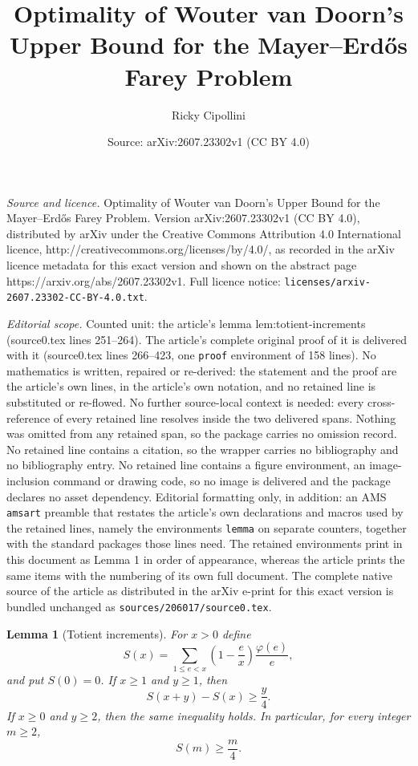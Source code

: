 \documentclass[10pt,a4paper]{amsart}
\title{Optimality of Wouter van Doorn's Upper Bound for the Mayer--Erdős Farey Problem}
\author{Ricky Cipollini}
\date{Source: arXiv:2607.23302v1 (CC BY 4.0)}
\newtheorem{lemma}{Lemma}
\begin{document}
\maketitle

\noindent\emph{Source and licence.} Optimality of Wouter van Doorn's Upper Bound for the Mayer--Erdős Farey Problem. Version arXiv:2607.23302v1 (CC BY 4.0), distributed by arXiv under the Creative Commons Attribution 4.0 International licence, http://creativecommons.org/licenses/by/4.0/, as recorded in the arXiv licence metadata for this exact version and shown on the abstract page https://arxiv.org/abs/2607.23302v1. Full licence notice: \texttt{licenses/arxiv-2607.23302-CC-BY-4.0.txt}.\par\smallskip

\noindent\textit{Editorial scope.} Counted unit: the article's lemma lem:totient-increments (source0.tex lines 251--264). The article's complete original proof of it is delivered with it (source0.tex lines 266--423, one \texttt{proof} environment of 158 lines). No mathematics is written, repaired or re-derived: the statement and the proof are the article's own lines, in the article's own notation, and no retained line is substituted or re-flowed.  No further source-local context is needed: every cross-reference of every retained line resolves inside the two delivered spans.  Nothing was omitted from any retained span, so the package carries no omission record.  No retained line contains a citation, so the wrapper carries no bibliography and no bibliography entry.  No retained line contains a figure environment, an image-inclusion command or drawing code, so no image is delivered and the package declares no asset dependency.  Editorial formatting only, in addition: an AMS \texttt{amsart} preamble that restates the article's own declarations and macros used by the retained lines, namely the environments \texttt{lemma} on separate counters, together with the standard packages those lines need.  The retained environments print in this document as Lemma 1 in order of appearance, whereas the article prints the same items with the numbering of its own full document.  The complete native source of the article as distributed in the arXiv e-print for this exact version is bundled unchanged as \texttt{sources/206017/source0.tex}.
\begin{lemma}[Totient increments]\label{lem:totient-increments}
For $x>0$ define
\[
  S(x)=\sum_{1\le e<x}\left(1-\frac ex\right)\frac{\varphi(e)}e,
\]
and put $S(0)=0$.  If $x\ge1$ and $y\ge1$, then
\[
  S(x+y)-S(x)\ge \frac y4.
\]
If $x\ge0$ and $y\ge2$, then the same inequality holds.  In particular, for every integer $m\ge2$,
\[
  S(m)\ge \frac m4.
\]
\end{lemma}
\end{document}
